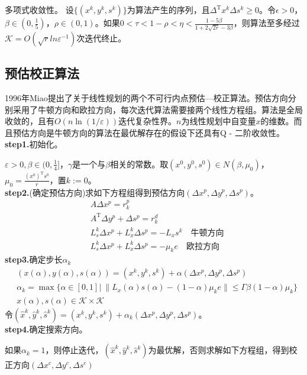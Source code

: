         多项式收敛性。
        设$\{(x^k,y^k,s^k)\}$为算法产生的序列，且${\Delta}^\mathrm{T}{x^k} {\Delta}{s^k}\geqslant 0$。令$\epsilon>0$，$\beta \in (0,\frac 15)$，$\rho \in (0,1)$。如果$0<\tau<1-\rho<\eta<\frac{1-5\beta}{1+2\sqrt{2r}-3\beta}$，则算法至多经过$\mathcal{K}=O(\sqrt{r}ln{\varepsilon}^{-1})$次迭代终止。
    \subsection{预估校正算法}
        \par
        1996年Miao提出了关于线性规划的两个不可行内点预估—校正算法。预估方向分别采用了牛顿方向和欧拉方向，每次迭代算法需要接两个线性方程组。算法是全局收敛的，且有$O(n\ln(1/\varepsilon))$迭代复杂性界。$n$为线性规划中自变量$x$的维数。而且预估方向是牛顿方向的算法在最优解存在的假设下还具有Q - 二阶收敛性。\\
        \textbf{step1.}初始化。\par
        $\varepsilon>0,\beta \in (0,\frac 14]$，$\gamma$是一个与$\beta$相关的常数。取$(x^0,y^0,s^0)\in N(\beta,{\mu}_0)$，${\mu}_0=\frac{(x^0)^\mathrm{T} s^0}{r}$，置$k:=0$。\\
        \textbf{step2.}(确定预估方向)求如下方程组得到预估方向$(\Delta x^p,\Delta y^p,\Delta s^p)$。
        \begin{align*}
        &A\Delta x^p=r_k^p\\
        &A^\mathrm{T} \Delta y^p+\Delta s^p=r_k^d\\
        &L_s^k\Delta x^p+L_x^k\Delta s^p=-L_xs^k\quad \text{牛顿方向}\\
        & L_s^k\Delta x^p+L_x^k\Delta s^p=-{\mu}_ke\quad \text{欧拉方向}
        \end{align*}
        \textbf{step3.}确定步长${\alpha}_k$
        \begin{align*}
        &(x({\alpha}),y({\alpha}),s({\alpha}))=(x^k,y^k,s^k)+\alpha (\Delta x^p,\Delta y^p,\Delta s^p)\\
        &{\alpha}_k={\max}\{{\alpha}\in[0,1]|\ \|L_x(\alpha)s(\alpha)-(1-\alpha){\mu}_ke\|\leqslant \Gamma\beta(1-\alpha){\mu}_k\}\\
        &x(\alpha),s(\alpha)\in \mathcal{K}\times \mathcal{K}
        \end{align*}
        令$({\hat{x}}^k,{\hat{y}}^k,{\hat{s}}^k)=(x^k,y^k,s^k)+{\alpha}_k(\Delta x^p,\Delta y^p,\Delta s^p)$。\\
        \textbf{step4.}确定搜索方向。\par
        如果${\alpha}_k=1$，则停止迭代，$({\hat{x}}^k,{\hat{y}}^k,{\hat{s}}^k)$为最优解，否则求解如下方程组，得到校正方向$(\Delta x^c,\Delta y^c,\Delta s^c)$
